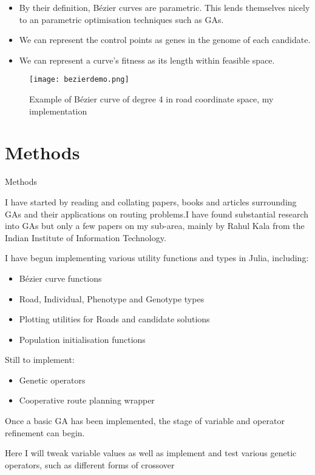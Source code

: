 \documentclass{beamer}
\begin{document}
\begin{frame}
    \begin{itemize}
        \item By their definition, Bézier curves are parametric. This lends themselves nicely to an parametric optimisation techniques such as GAs.
        \item We can represent the control points as genes in the genome of each candidate.
        \item We can represent a curve's fitness as its length within feasible space.
    \end{itemize}
\end{frame}

\begin{frame}
    \begin{figure}[htpb]
        \centering
        \texttt{[image: bezierdemo.png]}
        \caption{Example of Bézier curve of degree 4 in road coordinate space, my implementation}%
        \label{fig:bezierdemo}
    \end{figure}
\end{frame}

\section{Methods}

\begin{frame}{Methods}

I have started by reading and collating papers, books and articles surrounding GAs and their applications on routing problems.I have found substantial research into GAs but only a few papers on my sub-area, mainly by Rahul Kala from the Indian Institute of Information Technology.

I have begun implementing various utility functions and types in Julia\cite{JuliaProgrammingLanguage}, including:

\begin{itemize}
    \item Bézier curve functions
    \item Road, Individual, Phenotype and Genotype types
    \item Plotting utilities for Roads and candidate solutions
    \item Population initialisation functions
\end{itemize}

Still to implement: 

\begin{itemize}
    \item Genetic operators
    \item Cooperative route planning wrapper
\end{itemize}

\end{frame}
\begin{frame}
Once a basic GA has been implemented, the stage of variable and operator refinement can begin.

Here I will tweak variable values as well as implement and test various genetic operators, such as different forms of crossover 

\end{frame}
\end{document}
